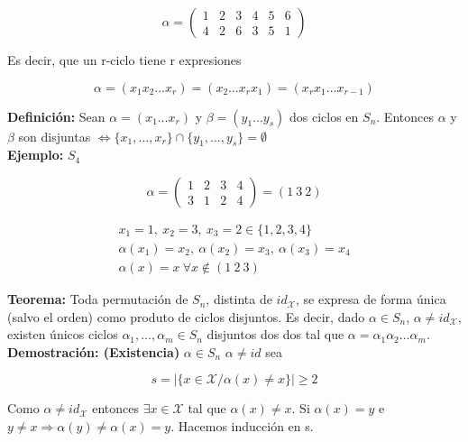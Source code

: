 \documentclass{article}
\begin{document}
\begin{equation*}
\alpha=
\begin{pmatrix}
1 & 2 & 3 & 4 & 5 & 6 \\
4 & 2 & 6 & 3 & 5 & 1
\end{pmatrix}
\end{equation*}

Es decir, que un r-ciclo tiene r expresiones

\begin{equation*}
\alpha=(x_1x_2\ldots x_r)=(x_2\ldots x_rx_1)=(x_rx_1\ldots x_{r-1})
\end{equation*}

\textbf{Definición:} Sean $\alpha=(x_1\ldots x_r)$ y $\beta=(y_1\ldots y_s)$ dos ciclos en $S_n$. Entonces $\alpha$ y $\beta$ son disjuntas $\Leftrightarrow \{x_1,\ldots,x_r\}\cap \{y_1,\ldots,y_s\}=\emptyset$ \\

\textbf{Ejemplo:} $S_4$

\begin{equation*}
\alpha=
\begin{pmatrix}
1 & 2 & 3 & 4 \\
3 & 1 & 2 & 4
\end{pmatrix}
=(1~3~2)
\end{equation*}

\begin{gather*}
x_1=1,~x_2=3,~x_3=2 \in \{1,2,3,4\} \\
\alpha(x_1)=x_2,~\alpha(x_2)=x_3,~\alpha(x_3)=x_4 \\
\alpha(x)=x~\forall x \notin (1~2~3)
\end{gather*}

\textbf{Teorema:} Toda permutación de $S_n$, distinta de $id_\mathcal{X}$, se expresa de forma única (salvo el orden) como produto de ciclos disjuntos. Es decir, dado $\alpha \in S_n$, $\alpha \neq id_\mathcal{X}$, existen únicos ciclos $\alpha_1, \ldots, \alpha_m \in S_n$ disjuntos dos dos tal que $\alpha = \alpha_1 \alpha_2 \ldots \alpha_m$. \\

\textbf{Demostración: (Existencia)} $\alpha \in  S_n$ $\alpha \neq id$ sea 

\begin{equation*}
s=|\{x \in \mathcal{X}/ \alpha(x)\neq x\}|\geq 2
\end{equation*} 

Como $\alpha \neq id_\mathcal{X}$ entonces $\exists x \in \mathcal{X}$ tal que $\alpha(x)\neq x$. Si $\alpha(x)=y$ e $y\neq x \Rightarrow \alpha(y)\neq \alpha(x)=y$. Hacemos inducción en s.  \\
\end{document}

